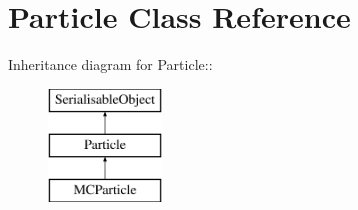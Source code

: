 \hypertarget{classParticle}{
\section{Particle Class Reference}
\label{classParticle}
}
Inheritance diagram for Particle::\begin{figure}[H]
\begin{center}
\leavevmode
\includegraphics[height=3cm]{classParticle}
\end{center}
\end{figure}
